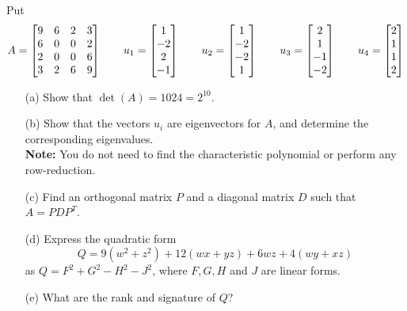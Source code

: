 \documentclass[a4paper]{article}
\begin{document}
\begin{problem}[Mock 1]
 Put 
 \[ A = \left[\begin{matrix}
         9&6&2&3\\
         6&0&0&2\\
         2&0&0&6\\
         3&2&6&9
        \end{matrix}\right] \qquad
    u_1 = \left[\begin{matrix} 1\\-2\\2\\-1 \end{matrix}\right] \qquad
    u_2 = \left[\begin{matrix} 1\\-2\\-2\\1 \end{matrix}\right] \qquad
    u_3 = \left[\begin{matrix} 2\\1\\-1\\-2 \end{matrix}\right] \qquad
    u_4 = \left[\begin{matrix} 2\\1\\1\\2 \end{matrix}\right]
 \]
 \begin{itemize}
  \item[(a)] Show that $\det(A)=1024=2^{10}$. 
  \item[(b)] Show that the vectors $u_i$ are eigenvectors for $A$, and
   determine the corresponding eigenvalues.   \\
   \textbf{Note:} You do not need to find the characteristic
   polynomial or perform any row-reduction.
  \item[(c)] Find an orthogonal matrix $P$ and a diagonal matrix $D$
   such that $A=PDP^T$. 
  \item[(d)] Express the quadratic form
   \[ Q = 9(w^2+z^2)+12(wx+yz)+6wz+4(wy+xz) \]
   as $Q=F^2+G^2-H^2-J^2$, where $F,G,H$ and $J$ are linear forms.
  \item[(e)] What are the rank and signature of $Q$? 
 \end{itemize}
\end{problem}
\end{document}

